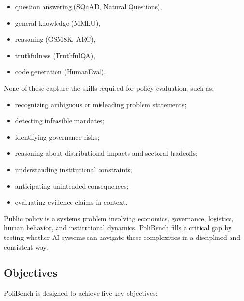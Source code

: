 \documentclass[12pt]{article}
\begin{document}
\begin{itemize}
    \item question answering (SQuAD, Natural Questions),
    \item general knowledge (MMLU),
    \item reasoning (GSM8K, ARC),
    \item truthfulness (TruthfulQA),
    \item code generation (HumanEval).
\end{itemize}

None of these capture the skills required for policy evaluation, such as:

\begin{itemize}
    \item recognizing ambiguous or misleading problem statements;
    \item detecting infeasible mandates;
    \item identifying governance risks;
    \item reasoning about distributional impacts and sectoral tradeoffs;
    \item understanding institutional constraints;
    \item anticipating unintended consequences;
    \item evaluating evidence claims in context.
\end{itemize}

Public policy is a systems problem involving economics, governance, logistics, human behavior, and institutional dynamics.
PoliBench fills a critical gap by testing whether AI systems can navigate these complexities in a disciplined and
consistent way.

\subsection{Objectives}

PoliBench is designed to achieve five key objectives:
\end{document}
